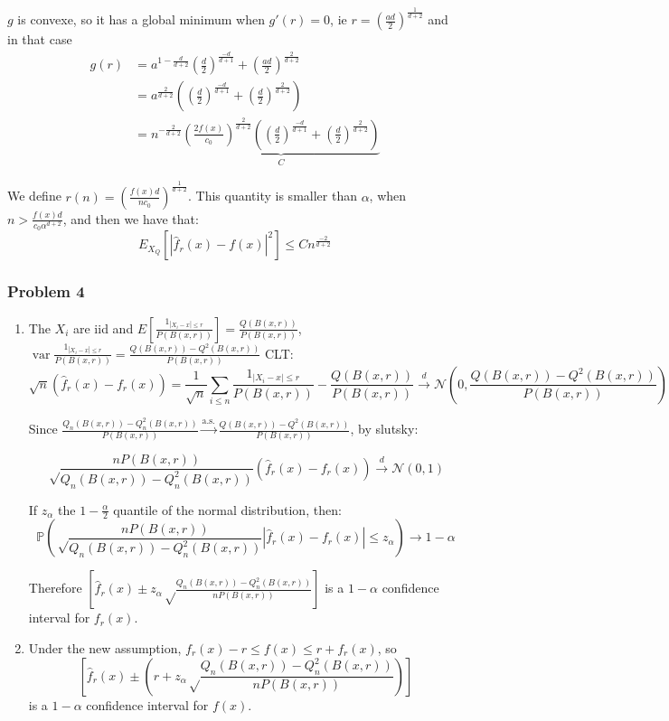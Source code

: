 \documentclass[12pt]{article}
\DeclareMathOperator{\var}{var}
\newcommand{\Q}[1]{\subsubsection*{Problem #1}}
\begin{document}
\begin{enumerate}
  $g$ is convexe, so it has a global minimum when $g'(r) = 0$, ie $r = \left(\frac{ad}2 \right)^{\frac1{d+2}}$
  and in that case
  \begin{align*}
    g(r) &= a^{1-\frac{d}{d+2}} (\frac{d}{2})^{\frac{-d}{d+1}} +  (\frac{ad}2)^{\frac2{d+2}}
    \\&= a^{\frac{2}{d+2}} \left( (\frac{d}{2})^{\frac{-d}{d+1}} + (\frac{d}2)^{\frac2{d+2}} \right)
    \\&=  n^{-\frac2{d+2}} \underbrace{(\frac{2f(x)}{c_0})^{\frac2{d+2}}\left( (\frac{d}{2})^{\frac{-d}{d+1}} + (\frac{d}2)^{\frac2{d+2}} \right)}_C
  \end{align*}

  We define $r(n) = \left(\frac{f(x)d}{n c_0} \right)^{\frac1{d+2}}$.
  This quantity is smaller than $\alpha$, when $ n > \frac{f(x)d}{c_0 \alpha^{d+2}}$, and then we have that:
  $$E_{X_Q}[|\hat f_r(x) - f(x)|^2]  \le C n^{\frac{-2} {d+2}}$$
\end{enumerate}

\Q{4}

\begin{enumerate}
\item
  The $X_i$ are iid and $E[\frac{1_{|X_i - x| \le r}}{P(B(x,r))}] = \frac{Q(B(x,r))}{P(B(x,r))}$, $\var \frac{1_{|X_i - x| \le r}}{P(B(x,r))} =  \frac{Q(B(x,r)) - Q^2(B(x,r))}{P(B(x,r))}$
  CLT:
  $$\sqrt{n} (\hat f_r(x) - f_r(x)) = \frac1{\sqrt n} \sum_{i\le n} \frac{1_{|X_i - x| \le r}}{P(B(x,r))} -  \frac{Q(B(x,r))}{P(B(x,r))} \overset{d}{\rightarrow} \mathcal N(0,  \frac{Q(B(x,r)) - Q^2(B(x,r))}{P(B(x,r))})$$

  Since $\frac{Q_n(B(x,r)) - Q_n^2(B(x,r))}{P(B(x,r))} \overset{\text{a.s.}}\rightarrow \frac{Q(B(x,r)) - Q^2(B(x,r))}{P(B(x,r))}$, by slutsky:

  $$\sqrt \frac{ nP(B(x,r))}{Q_n(B(x,r)) - Q_n^2(B(x,r))} (\hat f_r(x) - f_r(x))  \overset{d}{\rightarrow} \mathcal N(0, 1)$$

  If $z_{\alpha}$ the $1-\frac \alpha 2$ quantile of the normal distribution, then:
  $$\mathbb P \left(\sqrt\frac{nP(B(x,r))}{Q_n(B(x,r)) - Q_n^2(B(x,r))} |\hat f_r(x) - f_r(x)| \le z_{\alpha}\right) \rightarrow 1 - \alpha$$

  Therefore $[\hat f_r(x) \pm z_\alpha \sqrt \frac{Q_n(B(x,r)) - Q_n^2(B(x,r))}{nP(B(x,r))}]$ is a $1-\alpha$ confidence interval for $f_r(x)$.


\item Under the new assumption, $f_r(x) - r \le f(x) \le r + f_r(x)$, so
  $$[\hat f_r(x) \pm \left(r + z_\alpha \sqrt \frac{Q_n(B(x,r)) - Q_n^2(B(x,r))}{nP(B(x,r))}\right)]$$ is a $1-\alpha$ confidence interval for $f(x)$.
\end{enumerate}
\end{document}
